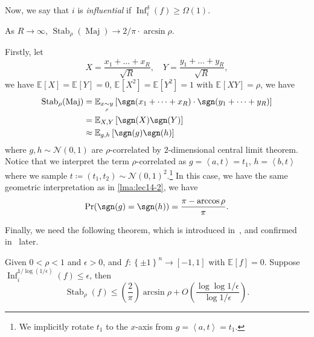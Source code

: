 Now, we say that \(i\) is \emph{influential} if \(\mathop{\mathrm{Inf}}_i^\delta (f) \geq \Omega (1).\)

\begin{claim}
	As \(R \to \infty \), \(\mathop{\mathrm{Stab}}_\rho (\mathop{\mathrm{Maj}}) \to 2 / \pi \cdot \arcsin \rho\).
\end{claim}
\begin{explanation}
	Firstly, let
	\[
		X = \frac{x_1 + \dots  + x_R}{\sqrt{R} },\quad
		Y = \frac{y_1 + \dots  + y_R}{\sqrt{R} },
	\]
	we have \(\mathbb{E}_{}\left[X \right] = \mathbb{E}_{}\left[Y \right] = 0\), \(\mathbb{E}_{}\left[X^2 \right] = \mathbb{E}_{}\left[Y^2 \right] = 1\) with \(\mathbb{E}_{}\left[XY \right] = \rho \), we have
	\[
		\begin{split}
			\mathop{\mathrm{Stab}}\nolimits_\rho (\mathop{\mathrm{Maj}})
			&= \mathbb{E}_{x \underset{\rho }{\sim } y}\left[ \sgn (x_1 + \dots + x_R ) \cdot \sgn (y_1 + \dots +y_R )\right]\\
			&= \mathbb{E}_{X, Y}\left[\sgn (X) \sgn (Y) \right]\\
			&\approx \mathbb{E}_{g, h}\left[\sgn (g)\sgn (h) \right]
		\end{split}
	\]
	where \(g, h \sim \mathcal{N} (0, 1)\) are \(\rho \)-correlated by \(2\)-dimensional central limit theorem. Notice that we interpret the term \(\rho \)-correlated as \(g=\left\langle a, t \right\rangle = t_1\), \(h=\left\langle b, t \right\rangle \) where we sample \(t \coloneqq (t_1, t_2)\sim \mathcal{N} (0, 1)^2\).\footnote{We implicitly rotate \(t_1\) to the \(x\)-axis from \(g=\left\langle a, t \right\rangle = t_1\).} In this case, we have the same geometric interpretation as in \autoref{lma:lec14-2}, we have
	\[
		\Pr_{}(\sgn (g) = \sgn (h)) = \frac{\pi - \arccos \rho }{\pi }.
	\]
\end{explanation}

Finally, we need the following theorem, which is introduced in~\cite{KKMO04}, and confirmed in~\cite{MOO05} later.

\begin{theorem}\label{thm:MIST}
	Given \(0 < \rho < 1\) and \(\epsilon > 0\), and \(f\colon \left\{ \pm 1 \right\} ^n \to [-1, 1]\) with \(\mathbb{E}_{}\left[f \right] = 0\). Suppose \(\mathop{\mathrm{Inf}}_i^{1 / \log (1 / \epsilon )}(f)\leq \epsilon \), then
	\[
		\mathop{\mathrm{Stab}}\nolimits_\rho (f) \leq \left( \frac{2}{\pi } \right) \arcsin \rho + O\left( \frac{\log \log 1 / \epsilon }{\log 1 / \epsilon } \right).
	\]
\end{theorem}
